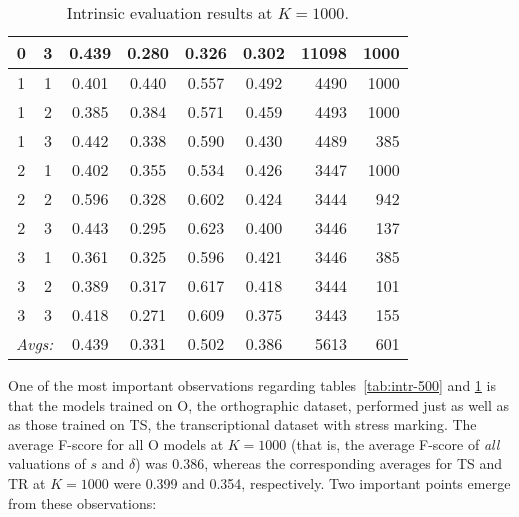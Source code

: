 \begin{table}[!ht]
{\begin{tabular}{cc|ccccrr}
0 & 3 & 0.439 & 0.280 & 0.326 & 0.302 & 11098 & 1000 \\ \hline %
1 & 1 & 0.401 & 0.440 & 0.557 & 0.492 & 4490 & 1000 \\%
1 & 2 & 0.385 & 0.384 & 0.571 & 0.459 & 4493 & 1000 \\%
1 & 3 & 0.442 & 0.338 & 0.590 & 0.430 & 4489 & 385 \\ \hline %
2 & 1 & 0.402 & 0.355 & 0.534 & 0.426 & 3447 & 1000 \\%
2 & 2 & 0.596 & 0.328 & 0.602 & 0.424 & 3444 & 942 \\%
2 & 3 & 0.443 & 0.295 & 0.623 & 0.400 & 3446 & 137 \\ \hline %
3 & 1 & 0.361 & 0.325 & 0.596 & 0.421 & 3446 & 385 \\
3 & 2 & 0.389 & 0.317 & 0.617 & 0.418 & 3444 & 101 \\%
3 & 3 & 0.418 & 0.271 & 0.609 & 0.375 & 3443 & 155 \\ \hline \hline%
 \multicolumn{2}{r|}{\textit{Avgs:}} & 0.439 & 0.331 & 0.502 & 0.386 & 5613 & 601 \\
\end{tabular}
\label{subtab:intr-O-1000}
}
\caption{Intrinsic evaluation results at $K = 1000$. 
}
\label{tab:intr-1000}
\end{table}

One of the most important observations regarding tables~\ref{tab:intr-500} and \ref{tab:intr-1000}
 is that the models trained on O, the orthographic dataset, performed just as well as as those trained on TS, the transcriptional dataset
  with stress marking.
  The average F-score for all O 
 models at $K=1000$ (that is, the average F-score of \emph{all} valuations of $s$
   and $\delta$) was 0.386, whereas the corresponding averages for TS and TR at $K=1000$ were 0.399 and 0.354, respectively.
  Two important points emerge from these observations: 
  

